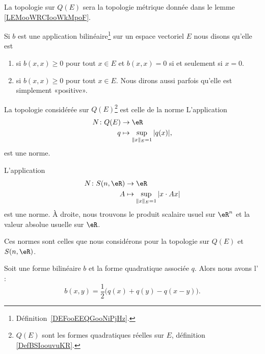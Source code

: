 La topologie sur \( Q(E)\) sera la topologie métrique donnée dans le lemme \ref{LEMooWRCIooWkMpoF}.

\begin{definition}      \label{DEFooJIAQooZkBtTy}
	Si \( b\) est une application bilinéaire\footnote{Définition~\ref{DEFooEEQGooNiPjHz}.} sur un espace vectoriel \( E\) nous disons qu'elle est
	\begin{enumerate}
		\item
		       si \( b(x,x)\geq 0\) pour tout \( x\in E\) et \( b(x,x)=0\) si et seulement si \( x=0\).
		\item
		       si \( b(x,x)\geq 0\) pour tout \( x\in E\). Nous dirons aussi parfois qu'elle est simplement «positive».
	\end{enumerate}
\end{definition}

\begin{lemma}       \label{LEMooWRCIooWkMpoF}
	La topologie considérée sur \( Q(E)\)\footnote{\( Q(E)\) sont les formes quadratiques réelles sur \( E\), définition \ref{DefBSIoouvuKR}.} est celle de la norme
	L'application
	\begin{equation}  \label{EqZYBooZysmVh}
		\begin{aligned}
			N\colon Q(E) & \to \eR                            \\
			q            & \mapsto\sup_{\| x \|_E=1}| q(x) |,
		\end{aligned}
	\end{equation}
	est une norme.

	L'application
	\begin{equation}  \label{EQooJETQooIjxRWu}
		\begin{aligned}
			N\colon S(n,\eR) & \to \eR                                  \\
			A                & \mapsto  \sup_{\| x \|_E=1}| x\cdot Ax |
		\end{aligned}
	\end{equation}
	est une norme.  À droite, nous trouvons le produit scalaire usuel sur \( \eR^n\) et la valeur absolue usuelle sur \( \eR\).

	Ces normes sont celles que nous considérons pour la topologie sur \( Q(E)\) et \( S(n,\eR)\).
\end{lemma}

\begin{proposition} \label{PROPooZLXVooOsXCcB}
	Soit une forme bilinéaire \( b\) et la forme quadratique associée \( q\). Alors nous avons l' :
	\begin{equation}    \label{EqMrbsop}
		b(x,y)=\frac{ 1 }{2}\big( q(x)+q(y)-q(x-y) \big).
	\end{equation}
\end{proposition}

